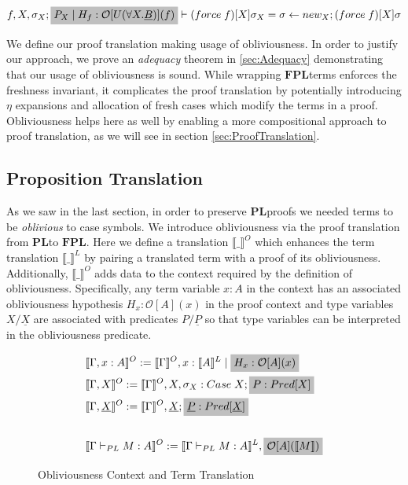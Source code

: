 \documentclass[acmsmall]{acmart}
\newcommand{\den}[1]{\llbracket #1\rrbracket}
\newcommand{\pl}{$\mathbf{PL}$}
\newcommand{\fpl}{$\mathbf{FPL}$}
\begin{document}
\begin{equation}
  \label{eqn:Obliv2}
  f,X,\sigma_X;\colorbox{lightgray}{$P_X \;|\; H_f : \mathcal{O}[U(\forall X. \underline{B})](f) $} \vdash (force\;f)[X]\sigma_X = \sigma \leftarrow new_X;(force\;f)[X]\sigma
\end{equation}

We define our proof translation making usage of obliviousness.
In order to justify our approach, we prove an \emph{adequacy} theorem in \cref{sec:Adequacy} demonstrating that our usage of obliviousness is sound. While wrapping \fpl\;terms enforces the freshness invariant, it complicates the proof translation by potentially introducing $\eta$ expansions and allocation of fresh cases which modify the terms in a proof. Obliviousness helps here as well by enabling a more compositional approach to proof translation, as we will see in section \cref{sec:ProofTranslation}. 


\subsection{Proposition Translation}\label{sec:PropTranslation}
As we saw in the last section, in order to preserve \pl\;proofs we needed terms to be \emph{oblivious} to case symbols. We introduce obliviousness via the proof translation from \pl\;to \fpl. Here we define a translation $\den{\_}^O$ which enhances the term translation $\den{\_}^L$ by pairing a translated term with a proof of its obliviousness. Additionally, $\den{\_}^O$ adds data to the context required by the definition of obliviousness. Specifically, any term variable $x :A$ in the context has an associated obliviousness hypothesis $H_x : \mathcal{O}[A](x)$ in the proof context and type variables $X/\underline{X}$ are associated with predicates $P/\underline{P}$ so that type variables can be interpreted in the obliviousness predicate. 



\begin{figure}[H]
  \centering
  \scriptsize
  \begin{align*} 
    &\den{\Gamma,x:A}^O := \den{\Gamma}^O,x : \den{A}^L \;|\; \colorbox{lightgray}{$H_x : \mathcal{O}[A](x)$}\\
    &\den{\Gamma,X}^O := \den{\Gamma}^O,X,\sigma_X : Case\;X ; \colorbox{lightgray}{$P : Pred[X]$}\\
    &\den{\Gamma,\underline{X}}^O := \den{\Gamma}^O,\underline{X};\colorbox{lightgray}{$\underline{P} : Pred[\underline{X}]$}\\
    \\
    &\den{\Gamma \vdash_{PL} M : A}^O := \den{\Gamma \vdash_{PL} M : A}^L, \colorbox{lightgray}{$\mathcal{O}[A](\den{M})$} 
  \end{align*}
  \caption{Obliviousness Context and Term Translation}
  \label{fig:d}
\end{figure}
\end{document}
